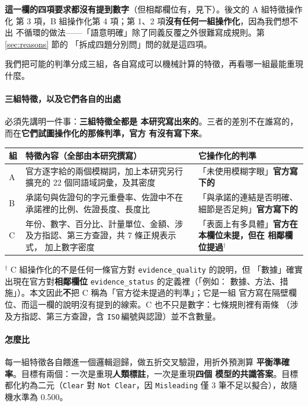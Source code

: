 \documentclass[11pt,a4paper]{ctexart}
\newcommand{\fn}[1]{\texttt{#1}}
\begin{document}
\textbf{這一欄的四項要求都沒有提到數字}（但相鄰欄位有，見下）。後文的 A 組特徵操作化
第 3 項，B 組操作化第 4 項；第 1、2 項\textbf{沒有任何一組操作化}，因為我們想不出
不循環的做法——「語意明確」除了同義反覆之外很難寫成規則。第 \ref{sec:reasons} 節的
「拆成四題分別問」問的就是這四項。

我們把可能的判準分成三組，各自寫成可以機械計算的特徵，再看哪一組最能重現什麼。

\paragraph{三組特徵，以及它們各自的出處} 必須先講明一件事：\textbf{三組特徵全都是
本研究寫出來的}。三者的差別不在誰寫的，而在\textbf{它們試圖操作化的那條判準，官方
有沒有寫下來}。

\begin{table}[h]
\centering\small
\begin{tabular}{@{}p{0.6cm}p{7.6cm}p{6.2cm}@{}}
\toprule
組 & 特徵內容（全部由本研究撰寫） & 它操作化的判準 \\
\midrule
A & 官方逐字給的兩個模糊詞，加上本研究另行擴充的 22 個同語域詞彙，及其密度 &
    「未使用模糊字眼」\newline \textbf{官方寫下的} \\
\addlinespace
B & 承諾句與佐證句的字元重疊率、佐證中不在承諾裡的比例、佐證長度、長度比 &
    「與承諾的連結是否明確、細節是否足夠」\newline \textbf{官方寫下的} \\
\addlinespace
\rowcolor{yellow!12}
C & 年份、數字、百分比、計量單位、金額、涉及方指認、第三方查證，共 7 條正規表示式，
    加上數字密度 & 「表面上有多具體」\newline \textbf{官方在本欄位未提，但在
    相鄰欄位提過}$^{\dagger}$ \\
\bottomrule
\end{tabular}
\end{table}

\medskip
$^{\dagger}$ C 組操作化的不是任何一條官方對 \fn{evidence\_quality} 的說明，但
「數據」確實出現在官方對\textbf{相鄰欄位} \fn{evidence\_status} 的定義裡（「例如：
數據、方法、措施」）。本文因此\textbf{不}把 C 稱為「官方從未提過的判準」；它是一組
官方寫在隔壁欄位、而這一欄的說明沒有提到的線索。C 也不只是數字：七條規則裡有兩條
（涉及方指認、第三方查證，含 \fn{ISO}$\,$編號與認證）並不含數量。

\paragraph{怎麼比} 每一組特徵各自餵進一個邏輯迴歸，做五折交叉驗證，用折外預測算
\textbf{平衡準確率}。目標有兩個：一次是重現\textbf{人類標註}，一次是重現\textbf{四個
模型的共識答案}。目標都化約為二元（\fn{Clear} 對 \fn{Not Clear}，因 \fn{Misleading}
僅 3 筆不足以擬合），故隨機水準為 0.500。
\end{document}
